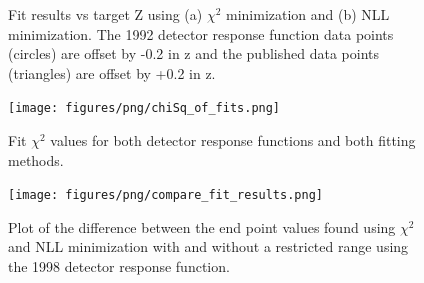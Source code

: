 \begin{figure}[h]
  \centering
  \hfill
  \caption{Fit results vs target Z using (a) $\chi^2$ minimization and (b) NLL minimization.
    The 1992 detector response function data points (circles) are offset by -0.2 in z and the published data points (triangles)
    are offset by +0.2 in z.
  }
\end{figure}

\begin{figure}[h]
  \centering
  \texttt{[image: figures/png/chiSq\_of\_fits.png]}
  \caption{Fit $\chi^2$ values for both detector response functions and both fitting methods. }
  \label{fig:ChiSqOfFits}
\end{figure}

\begin{figure}[h]
  \centering
  \texttt{[image: figures/png/compare\_fit\_results.png]}
  \caption{Plot of the difference between the end point values found using $\chi^2$ and
    NLL minimization with and without a restricted range using the 1998 detector response function.}
  \label{fig:compareFits}
\end{figure}

